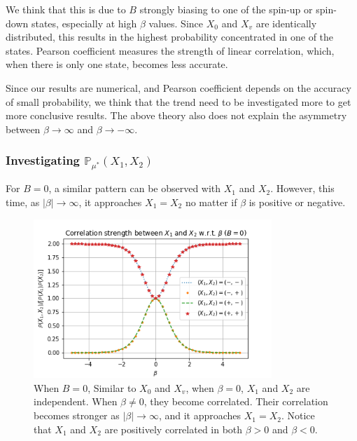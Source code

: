 \documentclass[12pt]{article}
\begin{document}
We think that this is due to $B$ strongly biasing to one of the spin-up or spin-down
states, especially at high $\beta$ values. Since $X_0$ and $X_v$ are identically distributed, this results in the highest probability concentrated in one of the states. Pearson coefficient measures the strength of linear correlation, which, when
there is only one state, becomes less accurate.

Since our results are numerical,
and Pearson coefficient depends on the accuracy of small probability, we think that
the trend need to be investigated more to get more conclusive results. The above theory
also does not explain the asymmetry between $\beta\rightarrow\infty$ and $\beta\rightarrow-\infty$.

\subsubsection{Investigating $\mathbb{P}_{\mu^*}(X_1, X_2)$}

For $B=0$, a similar pattern can be observed with $X_1$ and $X_2$. However, this time, as
$|\beta|\rightarrow\infty$, it approaches $X_1=X_2$ no matter if $\beta$ is positive or
negative.

\begin{figure}[h]
    \centering
    \includegraphics[width=9cm]{./img/ising_x1_x2.png}
    \caption{
        When $B=0$, Similar to $X_0$ and $X_v$, when $\beta=0$, $X_1$ and $X_2$ are independent.
        When $\beta\neq 0$, they become correlated. Their correlation becomes stronger
        as $|\beta|\rightarrow\infty$, and it approaches $X_1=X_2$. Notice that $X_1$ and $X_2$
        are positively correlated in both $\beta > 0$ and $\beta < 0$.}
    \label{Fig.ising-x1-x2}
\end{figure}
\end{document}
